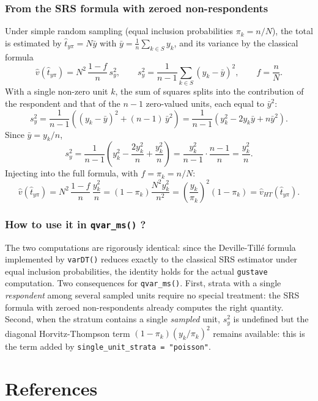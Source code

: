 \documentclass[
]{article}
\begin{document}
\subsubsection{From the SRS formula with zeroed
non-respondents}\label{from-the-srs-formula-with-zeroed-non-respondents}

Under simple random sampling (equal inclusion probabilities
\(\pi_k = n/N\)), the total is estimated by \(\hat t_{y\pi} = N \bar y\)
with \(\bar y = \frac{1}{n} \sum_{k \in S} y_k\), and its variance by
the classical formula \[
\hat v(\hat t_{y\pi}) = N^2 \, \frac{1-f}{n} \, s^2_y,
\qquad
s^2_y = \frac{1}{n-1} \sum_{k \in S} (y_k - \bar y)^2,
\qquad f = \frac{n}{N}.
\] With a single non-zero unit \(k\), the sum of squares splits into the
contribution of the respondent and that of the \(n - 1\) zero-valued
units, each equal to \(\bar y^2\): \[
s^2_y = \frac{1}{n-1} \left( (y_k - \bar y)^2 + (n-1)\,\bar y^2 \right)
      = \frac{1}{n-1} \left( y_k^2 - 2 y_k \bar y + n \bar y^2 \right).
\] Since \(\bar y = y_k / n\), \[
s^2_y = \frac{1}{n-1}
\left( y_k^2 - \frac{2 y_k^2}{n} + \frac{y_k^2}{n} \right)
= \frac{y_k^2}{n-1} \cdot \frac{n-1}{n}
= \frac{y_k^2}{n}.
\] Injecting into the full formula, with \(f = \pi_k = n/N\): \[
\hat v(\hat t_{y\pi})
= N^2 \, \frac{1 - f}{n} \, \frac{y_k^2}{n}
= \left(1 - \pi_k\right) \frac{N^2 y_k^2}{n^2}
= \left(\frac{y_k}{\pi_k}\right)^2 (1 - \pi_k)
= \hat v_{HT}(\hat t_{y\pi}).
\]

\subsubsection{\texorpdfstring{How to use it in \texttt{qvar\_ms()}
?}{How to use it in qvar\_ms() ?}}\label{how-to-use-it-in-qvar_ms}

The two computations are rigorously identical: since the Deville-Tillé
formula implemented by \texttt{varDT()} reduces exactly to the classical
SRS estimator under equal inclusion probabilities, the identity holds
for the actual \texttt{gustave} computation. Two consequences for
\texttt{qvar\_ms()}. First, strata with a single \emph{respondent} among
several sampled units require no special treatment: the SRS formula with
zeroed non-respondents already computes the right quantity. Second, when
the stratum contains a single \emph{sampled} unit, \(s^2_y\) is
undefined but the diagonal Horvitz-Thompson term
\((1-\pi_k)(y_k/\pi_k)^2\) remains available: this is the term added by
\texttt{single\_unit\_strata\ =\ "poisson"}.

\section{References}\label{references}
\end{document}
